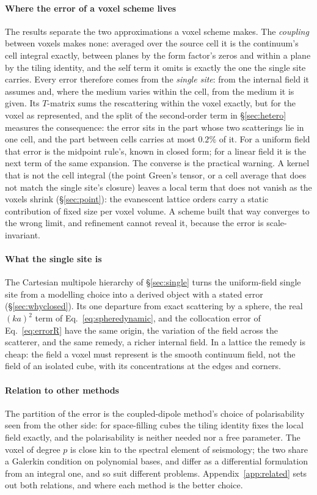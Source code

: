 \documentclass[preprint,review,12pt]{elsarticle}
\begin{document}
\paragraph{Where the error of a voxel scheme lives} The results separate the two approximations
a voxel scheme makes. The \emph{coupling} between voxels makes none: averaged over the source cell it
is the continuum's cell integral exactly, between planes by the form factor's zeros and within a
plane by the tiling identity, and the self term it omits is exactly the one the single site
carries. Every error therefore comes from the \emph{single site}: from the internal field it
assumes and, where the medium varies within the cell, from the medium it is given. Its $T$-matrix sums
the rescattering within the voxel exactly, but for the voxel as represented, and the split of the
second-order term in \S\ref{sec:hetero} measures the consequence: the error sits in the part whose two
scatterings lie in one cell, and the part between cells carries at most $0.2\%$ of it. For a uniform field that error is the midpoint rule's, known in closed form; for a linear
field it is the next term of the same expansion. The converse is the practical warning. A kernel that
is not the cell integral (the point Green's tensor, or a cell average that does not match the
single site's closure) leaves a local term that does not vanish as the voxels shrink
(\S\ref{sec:point}): the evanescent lattice orders carry a static contribution of fixed size per
voxel volume. A scheme built that way converges to the wrong limit, and refinement cannot reveal
it, because the error is scale-invariant.

\paragraph{What the single site is} The Cartesian multipole hierarchy of \S\ref{sec:single} turns the
uniform-field single site from a modelling choice into a derived object with a stated error
(\S\ref{sec:whyclosed}). Its one departure from exact scattering by a sphere, the real $(ka)^2$ term of
Eq.~\eqref{eq:spheredynamic}, and the collocation error of Eq.~\eqref{eq:errorR} have the same origin,
the variation of the field across the scatterer, and the same remedy, a richer internal field. In a lattice the
remedy is cheap: the field a voxel must represent is the smooth continuum field, not the field of an
isolated cube, with its concentrations at the edges and corners.

\paragraph{Relation to other methods} The partition of the error is the coupled-dipole method's
choice of polarisability seen from the other side: for space-filling cubes the tiling identity fixes
the local field exactly, and the polarisability is neither needed nor a free parameter. The voxel of
degree $p$ is close kin to the spectral element of seismology; the two share a Galerkin condition on
polynomial bases, and differ as a differential formulation from an integral one, and so suit different
problems. Appendix~\ref{app:related} sets out both relations, and where each method is the better
choice.
\end{document}
